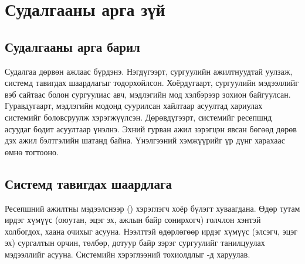 \chapter{Судалгааны арга зүй}
\label{ch:method}

%

\section{Судалгааны арга барил}
\label{sec:approach}

Судалгаа дөрвөн ажлаас бүрдэнэ. Нэгдүгээрт, сургуулийн ажилтнуудтай уулзаж, системд тавигдах шаардлагыг тодорхойлсон. Хоёрдугаарт, сургуулийн мэдээллийг вэб сайтаас болон сургуулиас авч, мэдлэгийн мод хэлбэрээр зохион байгуулсан. Гуравдугаарт, мэдлэгийн модонд суурилсан хайлтаар асуултад хариулах системийг боловсруулж хэрэгжүүлсэн. Дөрөвдүгээрт, системийг ресепшнд асуудаг бодит асуултаар үнэлнэ. Эхний гурван ажил зэрэгцэн явсан бөгөөд дөрөв дэх ажил бэлтгэлийн шатанд байна. Үнэлгээний хэмжүүрийг үр дүнг харахаас өмнө тогтооно.

\section{Системд тавигдах шаардлага}
\label{sec:requirements}

Ресепшний ажилтны мэдээлснээр () хэрэглэгч хоёр бүлэгт хуваагдана. Өдөр тутам ирдэг хүмүүс (оюутан, эцэг эх, ажлын байр сонирхогч) голчлон хэнтэй холбогдох, хаана очихыг асууна. Нээлттэй өдөрлөгөөр ирдэг хүмүүс (элсэгч, эцэг эх) сургалтын орчин, төлбөр, дотуур байр зэрэг сургуулийг танилцуулах мэдээллийг асууна. Системийн хэрэглээний тохиолдлыг -д харуулав.

